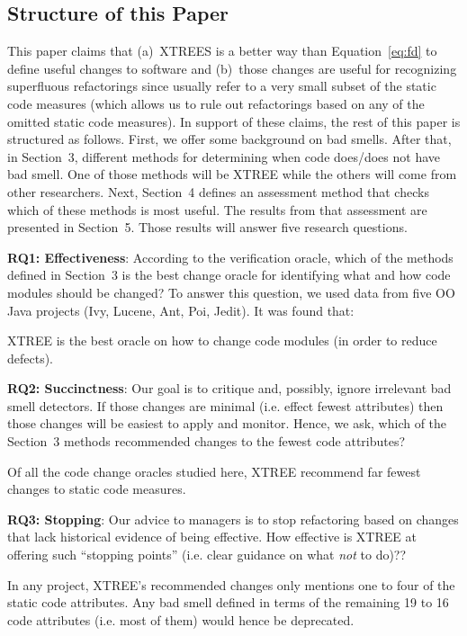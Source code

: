 \documentclass[twocolumn,5p]{elsarticle}
\newcommand{\eq}[1]{Equation~\ref{eq:#1}}
\theoremstyle{break}
\begin{document}
\subsection{Structure of this Paper}

This paper  claims that (a)~XTREES is a  better way than \eq{fd}  to define useful changes to software and (b)~those changes are useful for recognizing   superfluous refactorings since usually refer to a very 
small subset of the static code measures (which allows us to rule out refactorings based on any of the omitted
static code measures). 
In support of these claims, 
the rest of this paper is structured as follows. First, we offer some background on bad smells. After that,
  in Section~3, 
  different methods for determining when code does/does not have bad smell. One of those methods
  will be XTREE while the others will come from other researchers. Next,    Section~4
  defines an assessment method that checks which of these methods is most useful. The results from that assessment 
  are presented in Section~5. Those results will answer five research questions.

 {\bf  RQ1: Effectiveness}: According to the verification oracle, which of the methods  defined in Section~3 is the best  change oracle for identifying what and how
  code modules should be changed? To answer this question, we used data from five OO Java projects
  (Ivy, Lucene, Ant, Poi, Jedit). It was found that:
  \begin{lesson}
 XTREE is the best oracle on how to change code modules (in order to reduce defects).
  \end{lesson}

 {\bf RQ2: Succinctness}: Our goal is to critique and, possibly,
ignore irrelevant bad smell detectors.  If those changes are minimal (i.e. effect fewest attributes) then those changes
will be easiest to apply and monitor. Hence, we ask, which of the Section~3 methods recommended changes to the fewest
code attributes?
\begin{lesson}
Of all the code change oracles studied here, XTREE recommend  far fewest changes to static code measures.
\end{lesson}

 {\bf RQ3: Stopping}: Our advice to managers is to stop refactoring based on changes that lack
historical evidence of being effective. How effective is XTREE at offering such ``stopping points'' (i.e. clear guidance on what {\em not} to do)??
\begin{lesson}
In  any  project,  XTREE’s  recommended  changes  only  mentions one to four 
of the  static code attributes.  Any bad smell defined in terms of the remaining 19 to 16 code attributes (i.e. most of them)
would hence be deprecated.
\end{lesson}
\end{document}
